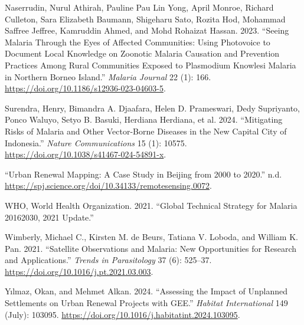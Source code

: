 \documentclass[
  letterpaper,
  DIV=11,
  numbers=noendperiod]{scrreprt}
\newlength{\cslhangindent}
\newlength{\cslentryspacingunit} %
\newenvironment{CSLReferences}[2] %
 {%
  \setlength{\parindent}{0pt}
  \ifodd #1
  \let\oldpar\par
  \def\par{\hangindent=\cslhangindent\oldpar}
  \fi
  \setlength{\parskip}{#2\cslentryspacingunit}
 }%
 {}
\begin{document}
\begin{CSLReferences}{1}{0}
\leavevmode{}%
Naserrudin, Nurul Athirah, Pauline Pau Lin Yong, April Monroe, Richard
Culleton, Sara Elizabeth Baumann, Shigeharu Sato, Rozita Hod, Mohammad
Saffree Jeffree, Kamruddin Ahmed, and Mohd Rohaizat Hassan. 2023.
{``Seeing Malaria Through the Eyes of Affected Communities: Using
Photovoice to Document Local Knowledge on Zoonotic Malaria Causation and
Prevention Practices Among Rural Communities Exposed to Plasmodium
Knowlesi Malaria in Northern Borneo Island.''} \emph{Malaria Journal} 22
(1): 166. \url{https://doi.org/10.1186/s12936-023-04603-5}.

\leavevmode{}%
Surendra, Henry, Bimandra A. Djaafara, Helen D. Prameswari, Dedy
Supriyanto, Ponco Waluyo, Setyo B. Basuki, Herdiana Herdiana, et al.
2024. {``Mitigating Risks of Malaria and Other Vector-Borne Diseases in
the New Capital City of Indonesia.''} \emph{Nature Communications} 15
(1): 10575. \url{https://doi.org/10.1038/s41467-024-54891-x}.

\leavevmode{}%
{``Urban Renewal Mapping: A Case Study in Beijing from 2000 to 2020.''}
n.d. \url{https://spj.science.org/doi/10.34133/remotesensing.0072}.

\leavevmode{}%
WHO, World Health Organization. 2021. {``Global Technical Strategy for
Malaria 2016{\textendash}2030, 2021 Update.''}

\leavevmode{}%
Wimberly, Michael C., Kirsten M. de Beurs, Tatiana V. Loboda, and
William K. Pan. 2021. {``Satellite Observations and Malaria: New
Opportunities for Research and Applications.''} \emph{Trends in
Parasitology} 37 (6): 525--37.
\url{https://doi.org/10.1016/j.pt.2021.03.003}.

\leavevmode{}%
Yılmaz, Okan, and Mehmet Alkan. 2024. {``Assessing the Impact of
Unplanned Settlements on Urban Renewal Projects with GEE.''}
\emph{Habitat International} 149 (July): 103095.
\url{https://doi.org/10.1016/j.habitatint.2024.103095}.

\end{CSLReferences}
\end{document}
